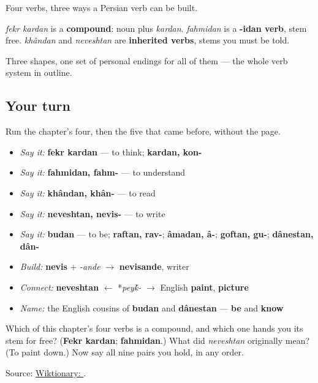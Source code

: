 \begin{grammarlens}[title={Grammar Lens: what this chapter has actually given you}]
Four verbs, three ways a Persian verb can be built.

\emph{fekr kardan} is a \textbf{compound}: noun plus \emph{kardan}. \emph{fahmidan} is a \textbf{-idan verb}, stem free. \emph{khândan} and \textbf{} \emph{neveshtan} are \textbf{inherited verbs}, stems you must be told.

Three shapes, one set of personal endings for all of them — the whole verb system in outline.
\end{grammarlens}

\subsection*{Your turn}
Run the chapter's four, then the five that came before, without the page.

\begin{itemize}
\raggedright
  \item \emph{Say it:} \textbf{fekr kardan} — to think; \textbf{kardan, kon-}
  \item \emph{Say it:} \textbf{fahmidan, fahm-} — to understand
  \item \emph{Say it:} \textbf{khândan, khân-} — to read
  \item \emph{Say it:} \textbf{neveshtan, nevis-} — to write
  \item \emph{Say it:} \textbf{budan} — to be; \textbf{raftan, rav-}; \textbf{âmadan, â-}; \textbf{goftan, gu-}; \textbf{dânestan, dân-}
  \item \emph{Build:} \textbf{nevis} + \emph{-ande} $\to$ \textbf{nevisande}, writer
  \item \emph{Connect:} \textbf{neveshtan} $\leftarrow$ *\emph{pey\'{k}-} $\to$ English \textbf{paint}, \textbf{picture}
  \item \emph{Name:} the English cousins of \textbf{budan} and \textbf{dânestan} — \textbf{be} and \textbf{know}
\end{itemize}

\begin{tcolorbox}[breakable,colback=teal!4,colframe=teal!35!black,title={Before you move on}]
Which of this chapter's four verbs is a compound, and which one hands you its stem for free? (\textbf{Fekr kardan}; \textbf{fahmidan}.) What did \emph{neveshtan} originally mean? (To paint down.) Now say all nine pairs you hold, in any order.

Source: \href{https://en.wiktionary.org/wiki/\%D9\%86\%D9\%88\%D8\%B4\%D8\%AA\%D9\%86}{Wiktionary: }.
\end{tcolorbox}
